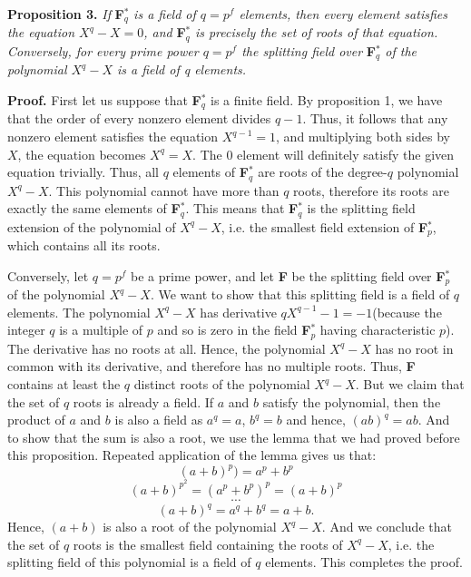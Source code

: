 \documentclass[12pt]{article}
\begin{document}
\textbf{Proposition 3.}
\textit{If }\textbf{F}$^*_q$ \textit{is a field of $q=p^f$ elements, then every element satisfies the equation $X^q-X=0$, and  }\textbf{F}$^*_q$ \textit{is precisely the set of roots of that equation. Conversely, for every prime power $q=p^f$ the splitting field over }\textbf{F}$^*_q$ \textit{of the polynomial $X^q-X$ is a field of q elements.}

\textbf{Proof.} First let us suppose that \textbf{F}$^*_q$ is a finite field. By proposition 1, we have that the order of every nonzero element divides $q-1$. Thus, it follows that any nonzero element satisfies the equation $X^{q-1}=1$, and multiplying both sides by $X$, the equation becomes $X^q=X$. The 0 element will definitely satisfy the given equation trivially.  Thus, all $q$ elements of \textbf{F}$^*_q$ are roots of the degree-$q$ polynomial $X^q-X$. This polynomial cannot have more than $q$ roots, therefore its roots are exactly the same elements of \textbf{F}$^*_q$. This means that \textbf{F}$^*_q$ is the splitting field extension of the polynomial of $X^q-X$, i.e. the smallest field extension of \textbf{F}$^*_p$, which contains all its roots.

Conversely, let $q=p^f$ be a prime power, and let \textbf{F} be the splitting field over \textbf{F}$^*_p$ of the polynomial $X^q-X$. We want to show that this splitting field is a field of $q$ elements. The polynomial $X^q-X$ has  derivative $qX^{q-1}-1=-1$(because the integer $q$ is a multiple of $p$ and so is zero in the field \textbf{F}$^*_p$ having characteristic $p$). The derivative has no roots at all. Hence, the polynomial $X^q-X$ has no root in common with its derivative, and therefore has no multiple roots. Thus, \textbf{F} contains at least the $q$ distinct roots of the polynomial $X^q-X$. But we claim that the set of $q$ roots is already a field. If $a$ and $b$ satisfy the polynomial, then the product of $a$ and $b$ is also a field as $a^q=a$, $b^q=b$ and hence, $(ab)^q=ab$. And to show that the sum is also a root, we use the lemma that we had proved before this proposition. Repeated application of the lemma gives us that:
 $$(a+b)^p)=a^p+b^p$$
 $$(a+b)^{p^2}=(a^p+b^p)^p=(a+b)^p$$
 $$\cdots$$
 $$(a+b)^{q}=a^q+b^q=a+b.$$
 Hence, $(a+b)$ is also a root of the polynomial $X^q-X$. And we conclude that the set of $q$ roots is the smallest field containing the roots of $X^q-X$, i.e. the splitting field of this polynomial is a field of $q$ elements. This completes the proof.
\end{document}
